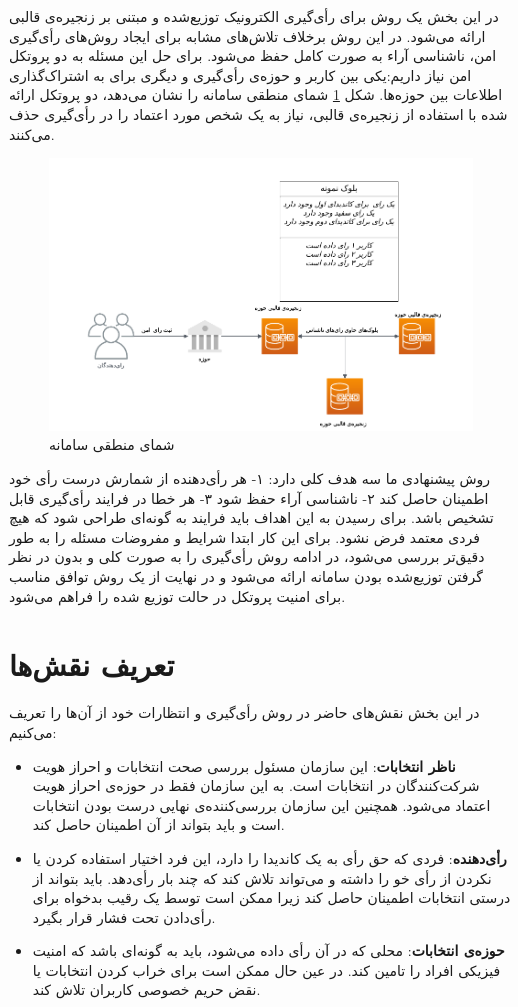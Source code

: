 در این بخش یک روش برای رأی‌گیری الکترونیک توزیع‌شده و مبتنی بر زنجیره‌ی قالبی ارائه می‌شود. در این روش برخلاف تلاش‌های مشابه برای ایجاد روش‌های رأی‌گیری امن، ناشناسی آراء به صورت کامل حفظ می‌شود. برای حل این مسئله به دو پروتکل امن نیاز داریم:یکی بین کاربر و حوزه‌ی رأی‌گیری و دیگری برای به اشتراک‌گذاری اطلاعات بین حوزه‌ها. شکل \ref{fig:toplevel} شمای منطقی سامانه را نشان می‌دهد، دو پروتکل ارائه شده با استفاده از زنجیره‌ی قالبی، نیاز به یک شخص مورد اعتماد را در رأی‌گیری حذف می‌کنند.
\begin{figure}[h!]
	\centering
	\includegraphics[width=1\linewidth]{toplevel.png}
	\caption {شمای منطقی سامانه}
	\label{fig:toplevel}
\end{figure}


\par
روش پیشنهادی ما سه هدف کلی دارد: ۱- هر رأی‌دهنده از شمارش درست رأی خود اطمینان حاصل کند ۲- ناشناسی آراء حفظ شود ۳- هر خطا در فرایند رأی‌گیری قابل تشخیص باشد. برای رسیدن به این اهداف باید فرایند به گونه‌ای طراحی شود که هیچ فردی معتمد فرض نشود. برای این کار ابتدا شرایط و مفروضات مسئله را به طور دقیق‌تر بررسی می‌شود، در ادامه روش رأی‌گیری را به صورت کلی و بدون در نظر گرفتن توزیع‌شده بودن سامانه ارائه می‌شود و در نهایت از یک روش توافق مناسب برای امنیت پروتکل در حالت توزیع شده را فراهم می‌شود. 
\section{تعریف نقش‌ها}
در این بخش نقش‌های حاضر در روش رأی‌گیری و انتظارات خود از آن‌ها را تعریف می‌کنیم:
\begin{itemize}
	\item
	\textbf{ناظر انتخابات}:
	این سازمان مسئول بررسی صحت انتخابات و احراز هویت شرکت‌کنندگان در انتخابات است. به این سازمان فقط در حوزه‌ی احراز هویت اعتماد می‌شود. همچنین این سازمان بررسی‌کننده‌ی نهایی درست بودن انتخابات است و باید بتواند از آن اطمینان حاصل کند.
	\item
	\textbf{رأی‌دهنده}:
	فردی که حق رأی به یک کاندیدا را دارد، این فرد اختیار استفاده کردن یا نکردن از رأی خو را داشته و می‌تواند تلاش کند که چند بار رأی‌دهد. باید بتواند از درستی انتخابات اطمینان حاصل کند زیرا ممکن است توسط یک رقیب بدخواه برای رأی‌دادن تحت فشار قرار بگیرد.
	\item
	\textbf{حوزه‌ی انتخابات}:
	محلی که در آن رأی داده می‌شود، باید به گونه‌ای باشد که امنیت فیزیکی افراد را تامین کند. در عین حال ممکن است برای خراب کردن انتخابات یا نقض حریم خصوصی کاربران تلاش کند. 
\end{itemize}
